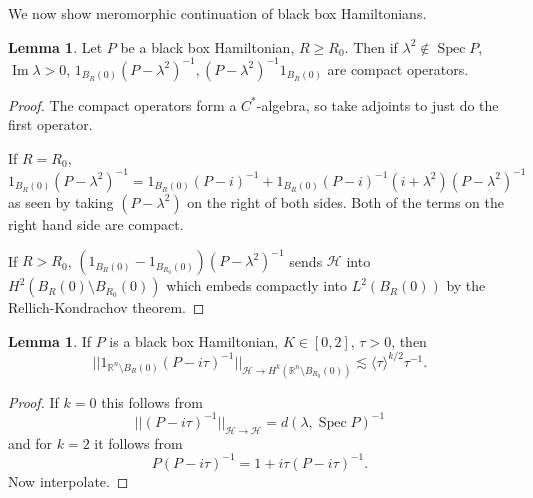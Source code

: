 \documentclass[12pt]{report}
\newcommand{\RR}{\mathbb{R}}
\newcommand{\Spec}{\operatorname{Spec}}
\renewcommand{\Im}{\operatorname{Im}}
\theoremstyle{definition}
\newtheorem{lemma}[theorem]{Lemma}
\begin{document}
We now show meromorphic continuation of black box Hamiltonians.
\begin{lemma}
Let $P$ be a black box Hamiltonian, $R \geq R_0$. Then if $\lambda^2 \notin \Spec P$, $\Im \lambda > 0$, $1_{B_R(0)}(P - \lambda^2)^{-1}, (P - \lambda^2)^{-1}1_{B_R(0)}$ are compact operators.
\end{lemma}
\begin{proof}
The compact operators form a $C^*$-algebra, so take adjoints to just do the first operator.

If $R = R_0$,
$$1_{B_R(0)}(P - \lambda^2)^{-1} = 1_{B_R(0)}(P - i)^{-1} + 1_{B_R(0)}(P - i)^{-1}(i + \lambda^2)(P - \lambda^2)^{-1}$$
as seen by taking $(P - \lambda^2)$ on the right of both sides. Both of the terms on the right hand side are compact.

If $R > R_0$, $(1_{B_R(0)} - 1_{B_{R_0}(0)})(P - \lambda^2)^{-1}$ sends $\mathcal H$ into $H^2(B_R(0) \setminus B_{R_0}(0))$ which embeds compactly into $L^2(B_R(0))$ by the Rellich-Kondrachov theorem.
\end{proof}
\begin{lemma}
If $P$ is a black box Hamiltonian, $K \in [0, 2]$, $\tau > 0$, then
$$||1_{\RR^n \setminus B_R(0)}(P - i\tau)^{-1}||_{\mathcal H \to H^k(\RR^n \setminus B_{R_0}(0))} \lesssim \langle \tau\rangle^{k/2}\tau^{-1}.$$
\end{lemma}
\begin{proof}
If $k = 0$ this follows from
$$||(P - i\tau)^{-1}||_{\mathcal H \to \mathcal H} = d(\lambda, \Spec P)^{-1}$$
and for $k = 2$ it follows from
$$P(P - i\tau)^{-1} = 1 + i\tau(P - i\tau)^{-1}.$$
Now interpolate.
\end{proof}
\end{document}
